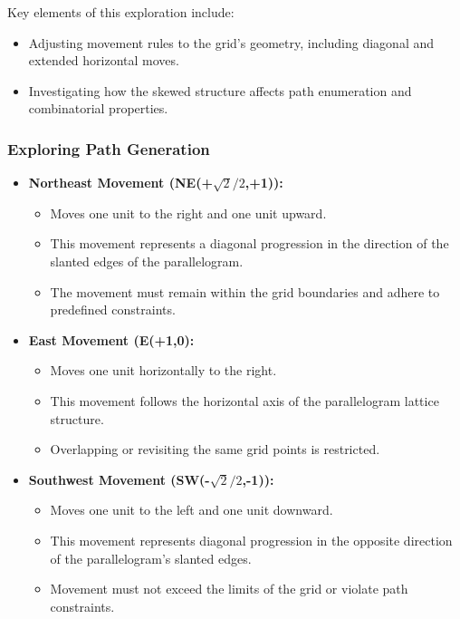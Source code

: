 \documentclass{article}
\begin{document}
Key elements of this exploration include:
\begin{itemize}
    \item Adjusting movement rules to the grid's geometry, including diagonal and extended horizontal moves.
    \item Investigating how the skewed structure affects path enumeration and combinatorial properties.
\end{itemize}
\subsubsection{Exploring Path Generation}
\begin{itemize}
    \item \textbf{Northeast Movement (NE(+$\sqrt{2}/2$,+1)):}
\begin{itemize}
    \item Moves one unit to the right and one unit upward.
    \item This movement represents a diagonal progression in the direction of the slanted edges of the parallelogram.
    \item The movement must remain within the grid boundaries and adhere to predefined constraints.
\end{itemize}

    \item \textbf{East Movement (E(+1,0):}
\begin{itemize}
    \item Moves one unit horizontally to the right.
    \item This movement follows the horizontal axis of the parallelogram lattice structure.
    \item Overlapping or revisiting the same grid points is restricted.
\end{itemize}

    \item \textbf{Southwest Movement (SW(-$\sqrt{2}/2$,-1)):}
\begin{itemize}
    \item Moves one unit to the left and one unit downward.
    \item This movement represents diagonal progression in the opposite direction of the parallelogram's slanted edges.
    \item Movement must not exceed the limits of the grid or violate path constraints.
\end{itemize}
 


\end{itemize}
\end{document}
